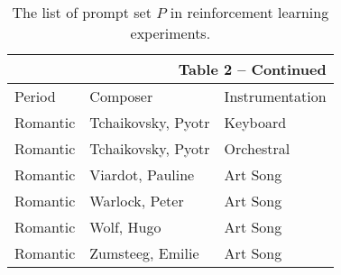 \begin{table}[!t]
    \centering
    \begin{tabular}{@{}lll@{}}
        \multicolumn{3}{r}{Table 2 -- Continued} \\
        \toprule
        Period    & Composer                  & Instrumentation \\
        \midrule        
        Romantic & Tchaikovsky, Pyotr & Keyboard \\
        Romantic & Tchaikovsky, Pyotr & Orchestral \\
        Romantic & Viardot, Pauline & Art Song \\
        Romantic & Warlock, Peter & Art Song \\
        Romantic & Wolf, Hugo & Art Song \\
        Romantic & Zumsteeg, Emilie & Art Song \\
        \bottomrule
    \end{tabular}
    \caption{The list of prompt set $P$ in reinforcement learning experiments.}
    \label{tab:promptset}
\end{table}





